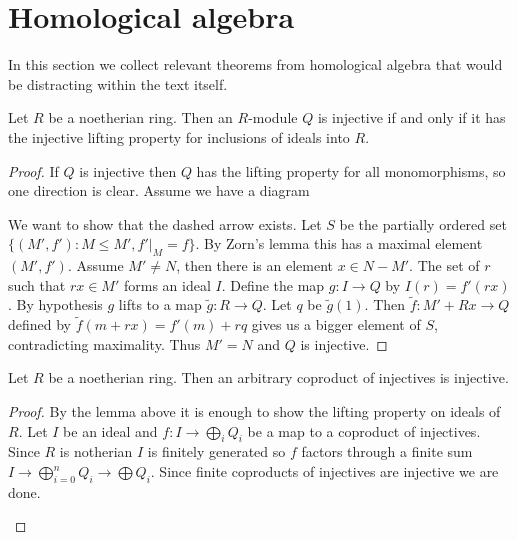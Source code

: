 \section{Homological algebra}\label{sec:appendix}

In this section we collect relevant theorems from homological algebra that would be distracting within the text itself.

\begin{lemma}\cite[Chapter I, theorem 3.2]{CE56} \label{lem:injectives_for_noetherian_ring}
	Let $R$ be a noetherian ring. Then an $R$-module $Q$ is injective if and only if it has the injective lifting property for inclusions of ideals into $R$.
	\begin{proof}
		If $Q$ is injective then $Q$ has the lifting property for all monomorphisms, so one direction is clear. Assume we have a diagram
		\begin{center}
		\end{center}
		We want to show that the dashed arrow exists. Let $S$ be the partially ordered set $\{(M', f'): M \leq M', f'|_M = f\}$. By Zorn's lemma this has a maximal element $(M', f')$. Assume $M' \neq N$, then there is an element $x \in N - M'$. The set of $r$ such that $rx \in M'$ forms an ideal $I$. Define the map $g: I \to Q$ by $I(r) = f'(rx)$. By hypothesis $g$ lifts to a map $\tilde{g}:R \to Q$. Let $q$ be $\tilde{g}(1)$. Then $\tilde{f}: M' + Rx \to Q$ defined by $\tilde{f}(m + rx) = f'(m) + rq$ gives us a bigger element of $S$, contradicting maximality. Thus $M'=N$ and $Q$ is injective.
	\end{proof}
\end{lemma}

\begin{theorem}
	Let $R$ be a noetherian ring. Then an arbitrary coproduct of injectives is injective.
	\begin{proof}
		By the lemma above it is enough to show the lifting property on ideals of $R$. Let $I$ be an ideal and $f:I \to \bigoplus_i Q_i$ be a map to a coproduct of injectives. Since $R$ is notherian $I$ is finitely generated so $f$ factors through a finite sum $I \to \bigoplus_{i=0}^n Q_i \to \bigoplus Q_i$. Since finite coproducts of injectives are injective we are done.
		\begin{center}
		\end{center}
	\end{proof}
\end{theorem}

